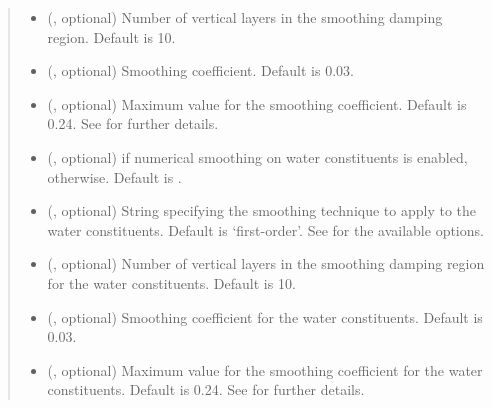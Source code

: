 \documentclass[letterpaper,10pt,english]{sphinxmanual}
\begin{document}
\begin{fulllineitems}
\begin{fulllineitems}
\begin{quote}
\begin{description}
\begin{itemize}
\item {} 
 (, optional) \textendash{} Number of vertical layers in the smoothing damping region. Default is 10.

\item {} 
 (, optional) \textendash{} Smoothing coefficient. Default is 0.03.

\item {} 
 (, optional) \textendash{} Maximum value for the smoothing coefficient. Default is 0.24.
See {\hyperref[\detokenize{api:tasmania.dycore.horizontal_smoothing.HorizontalSmoothing}]{}} for further details.

\item {} 
 (, optional) \textendash{}  if numerical smoothing on water constituents is enabled,  otherwise.
Default is .

\item {} 
 (, optional) \textendash{} String specifying the smoothing technique to apply to the water constituents. Default is ‘first-order’.
See {\hyperref[\detokenize{api:tasmania.dycore.horizontal_smoothing.HorizontalSmoothing}]{}} for the available options.

\item {} 
 (, optional) \textendash{} Number of vertical layers in the smoothing damping region for the water constituents. Default is 10.

\item {} 
 (, optional) \textendash{} Smoothing coefficient for the water constituents. Default is 0.03.

\item {} 
 (, optional) \textendash{} Maximum value for the smoothing coefficient for the water constituents. Default is 0.24.
See {\hyperref[\detokenize{api:tasmania.dycore.horizontal_smoothing.HorizontalSmoothing}]{}} for further details.


\end{itemize}
\end{description}
\end{quote}
\end{fulllineitems}
\end{fulllineitems}
\end{document}

